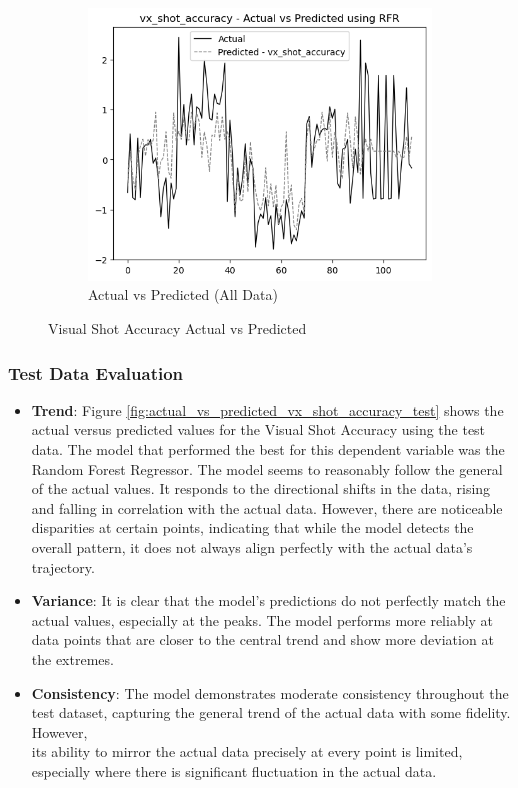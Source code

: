 \begin{figure}[htbp]
\begin{subfigure}[b]{0.49\textwidth}
        \includegraphics[width=\textwidth]{images/regressionCharts/all_data_visual_shot_accuracy.png}
        \caption{Actual vs Predicted (All Data)}
        \label{fig:actual_vs_predicted_vx_shot_accuracy_all_data}
    \end{subfigure}
    \caption{Visual Shot Accuracy Actual vs Predicted}
    \label{fig:visual_shot_accuracy_comparison}
\end{figure}

\subsubsection*{Test Data Evaluation}

\begin{itemize}
    \item \textbf{Trend}: Figure \ref{fig:actual_vs_predicted_vx_shot_accuracy_test} shows the actual versus predicted values for the Visual Shot Accuracy using the test data. The model that performed
          the best for this dependent variable was the Random Forest Regressor. The model seems to reasonably follow the general of the actual values. It responds to the directional shifts in the data,
          rising and falling in correlation with the actual data. However, there are noticeable disparities at certain points, indicating that while the model detects the overall pattern, it does not always align
          perfectly with the actual data's trajectory.
    \item \textbf{Variance}: It is clear that the model's predictions do not perfectly match the actual values, especially at the peaks. The model performs
          more reliably at data points that are closer to the central trend and show more deviation at the extremes.
    \item \textbf{Consistency}: The model demonstrates moderate consistency throughout the test dataset, capturing the general trend of the actual data with some fidelity. However, \\
          its ability to mirror the actual data precisely at every point is limited, especially where there is significant fluctuation in the actual data.

\end{itemize}

